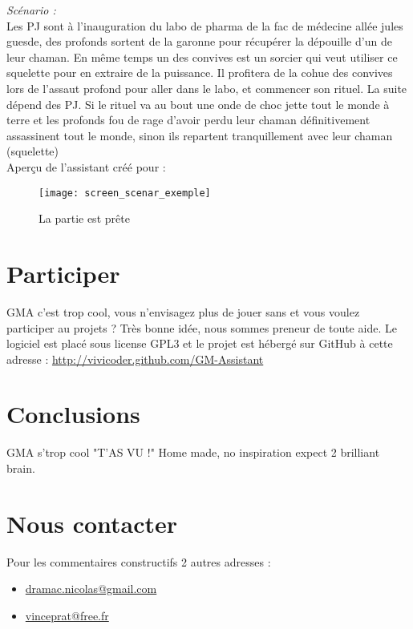 \documentclass[12pt]{article}
\begin{document}
\emph{Scénario :}\\ 
Les PJ sont à l'inauguration du labo de pharma de la fac de médecine allée jules guesde, des profonds sortent de la garonne pour récupérer la dépouille d'un de leur chaman.
En même temps un des convives est un sorcier qui veut utiliser ce squelette pour en extraire de la puissance. Il profitera de la cohue des convives lors de l'assaut profond pour aller dans le labo, et commencer son rituel. La suite dépend des PJ. Si le rituel va au bout une onde de choc jette tout le monde à terre et les profonds fou de rage d'avoir perdu leur chaman définitivement assassinent tout le monde, sinon ils repartent tranquillement avec leur chaman (squelette)
\\
Aperçu de l'assistant créé pour :
\begin{figure}[h]
    \texttt{[image: screen\_scenar\_exemple]}
    \caption{La partie est prête}
\end{figure}

\section{Participer}\label{participer}
GMA c'est trop cool, vous n'envisagez plus de jouer sans et vous voulez participer au projets ?
Très bonne idée, nous sommes preneur de toute aide.
Le logiciel est placé sous license GPL3 et le projet est hébergé sur GitHub à cette adresse :
\href{http://vivicoder.github.com/GM-Assistant}{http://vivicoder.github.com/GM-Assistant}

\section{Conclusions}\label{conclusions}
GMA s'trop cool "T'AS VU !"
Home made, no inspiration expect 2 brilliant brain.

\section*{Nous contacter}
Pour les commentaires constructifs 2 autres adresses :
\begin{itemize}
    \item \href{mailto:dramac.nicolas@gmail.com}{dramac.nicolas@gmail.com}
    \item \href{mailto:vinceprat@free.fr}{vinceprat@free.fr}
\end{itemize}
\end{document}
